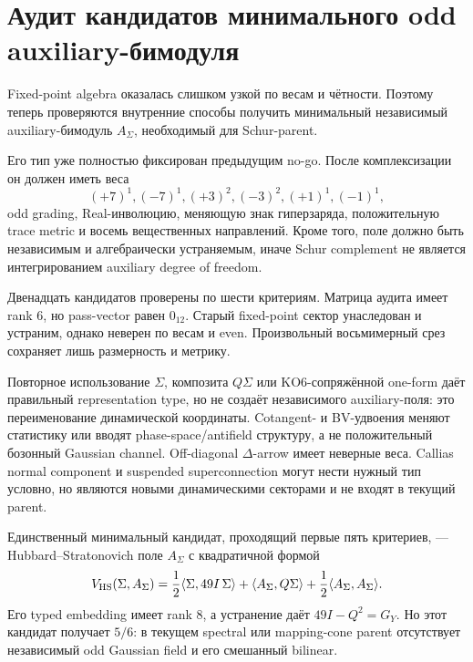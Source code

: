 \chapter{Аудит кандидатов минимального odd auxiliary-бимодуля}
\label{ch:v10-h15-r2-minimal-odd-auxiliary-audit}

Fixed-point algebra оказалась слишком узкой по весам и чётности. Поэтому
теперь проверяются внутренние способы получить минимальный независимый
auxiliary-бимодуль $A_\Sigma$, необходимый для Schur-parent.

Его тип уже полностью фиксирован предыдущим no-go. После комплексизации он
должен иметь веса
\begin{equation}
 (+7)^1,(-7)^1,(+3)^2,(-3)^2,(+1)^1,(-1)^1,
\end{equation}
odd grading, Real-инволюцию, меняющую знак гиперзаряда, положительную
trace metric и восемь вещественных направлений. Кроме того, поле должно
быть независимым и алгебраически устраняемым, иначе Schur complement не
является интегрированием auxiliary degree of freedom.

Двенадцать кандидатов проверены по шести критериям. Матрица аудита имеет
rank $6$, но pass-vector равен $0_{12}$. Старый fixed-point сектор
унаследован и устраним, однако неверен по весам и even. Произвольный
восьмимерный срез сохраняет лишь размерность и метрику.

Повторное использование $\Sigma$, композита $Q\Sigma$ или KO6-сопряжённой
one-form даёт правильный representation type, но не создаёт независимого
auxiliary-поля: это переименование динамической координаты. Cotangent- и
BV-удвоения меняют статистику или вводят phase-space/antifield структуру,
а не положительный бозонный Gaussian channel. Off-diagonal $\Delta$-arrow
имеет неверные веса. Callias normal component и suspended
superconnection могут нести нужный тип условно, но являются новыми
динамическими секторами и не входят в текущий parent.

Единственный минимальный кандидат, проходящий первые пять критериев, ---
Hubbard--Stratonovich поле $A_\Sigma$ с квадратичной формой
\begin{equation}
 V_{\rm HS}(\Sigma,A_\Sigma)
 =\frac12\langle\Sigma,49I\,\Sigma\rangle
 +\langle A_\Sigma,Q\Sigma\rangle
 +\frac12\langle A_\Sigma,A_\Sigma\rangle.
\end{equation}
Его typed embedding имеет rank $8$, а устранение даёт
$49I-Q^2=G_Y$. Но этот кандидат получает $5/6$: в текущем spectral или
mapping-cone parent отсутствует независимый odd Gaussian field и его
смешанный bilinear.

